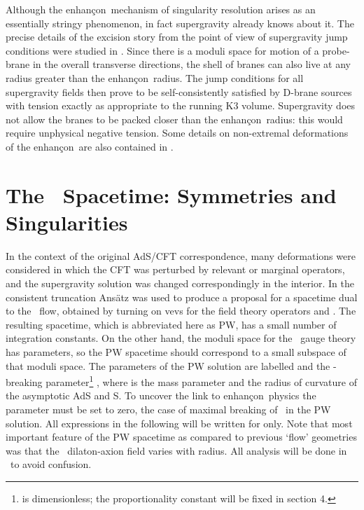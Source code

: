 \documentclass[a4paper,12pt]{amsproc}
\numberwithin{equation}{section}
\def\enh{enhan\c con}
\def\nef{\myHighlight{$n{=}4$}\coordHE{}}
\def\net{\myHighlight{$n{=}2$}\coordHE{}}
\def\nets{\myHighlight{$n{=}2*$}\coordHE{}}
\def\detn{\myHighlight{$d{=}10$}\coordHE{}}
\begin{document}
Although the \enh\ mechanism of singularity resolution arises as an
essentially stringy phenomenon, in fact supergravity already knows
about it.  The precise details of the excision story from the point of
view of supergravity jump conditions were studied in \cite{jmpr}.
Since there is a moduli space for motion of a probe-brane in the
overall transverse directions, the shell of branes can also live at
any radius greater than the \enh\ radius.  The jump conditions for all
supergravity fields then prove to be self-consistently satisfied by
D-brane sources with tension exactly as appropriate to the running K3
volume.  Supergravity does not allow the branes to be packed closer
than the \enh\ radius: this would require unphysical negative tension.
Some details on non-extremal deformations of the \enh\ are also
contained in \cite{jmpr}.

\section{The  \nets\ Spacetime: Symmetries and Singularities}

In the context of the original AdS\coordHE{}/CFT\coordHE{} correspondence, many
deformations were considered in which the CFT was perturbed by
relevant or marginal operators, and the supergravity solution was
changed correspondingly in the interior.  In \cite{pilwar} the
consistent truncation Ans{\"a}tz was used to produce a proposal for a
spacetime dual to the \nets\ flow, obtained by turning on vevs for the
field theory operators
%
\coordHE{}
%
and
%
\coordHE{}.
%
The resulting spacetime, which is abbreviated here as PW, has a small
number of integration constants.  On the other hand, the moduli space
for the \net\ gauge theory has \coordHE{} parameters, so the PW spacetime
should correspond to a small subspace of that moduli space.  The
parameters of the PW solution are labelled \myHighlight{$\gamma$}\coordHE{} and the
\nef-breaking parameter\footnote{\coordHE{} is dimensionless; the
proportionality constant will be fixed in section 4.}  \coordHE{},
where \coordHE{} is the mass parameter and \coordHE{} the radius of curvature of the
asymptotic AdS\coordHE{} and S\coordHE{}.  To uncover the link to \enh\ physics
the parameter \myHighlight{$\gamma$}\coordHE{} must be set to zero, the case of maximal
breaking of \nef\ in the PW solution.  All expressions in the
following will be written for \coordHE{} only.  Note that most
important feature of the PW spacetime as compared to previous `flow'
geometries was that the \detn\ dilaton-axion field varies with radius.
All analysis will be done in \detn\ to avoid confusion.
\end{document}
